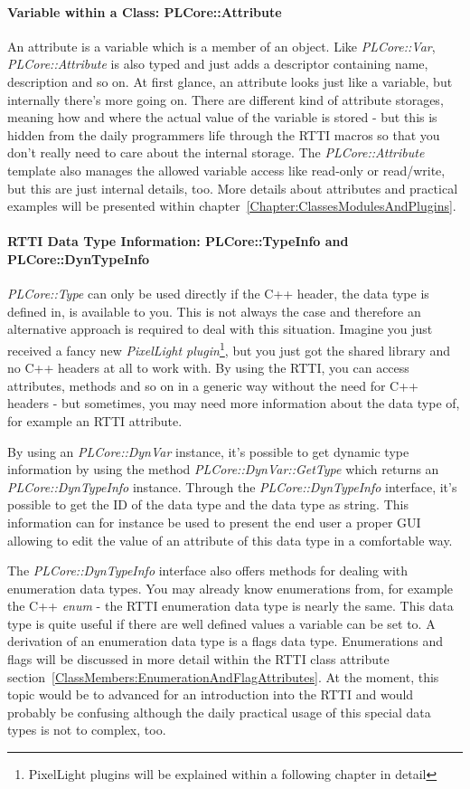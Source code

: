 \paragraph{Variable within a Class: PLCore::Attribute}
An attribute is a variable which is a member of an object. Like \emph{PLCore::Var}, \emph{PLCore::Attribute} is also typed and just adds a descriptor containing name, description and so on. At first glance, an attribute looks just like a variable, but internally there's more going on. There are different kind of attribute storages, meaning how and where the actual value of the variable is stored - but this is hidden from the daily programmers life through the RTTI macros so that you don't really need to care about the internal storage. The \emph{PLCore::Attribute} template also manages the allowed variable access like read-only or read/write, but this are just internal details, too. More details about attributes and practical examples will be presented within chapter~\ref{Chapter:ClassesModulesAndPlugins}.


\paragraph{RTTI Data Type Information: PLCore::TypeInfo and PLCore::DynTypeInfo}
\emph{PLCore::Type} can only be used directly if the C++ header, the data type is defined in, is available to you. This is not always the case and therefore an alternative approach is required to deal with this situation. Imagine you just received a fancy new \emph{PixelLight plugin}\footnote{PixelLight plugins will be explained within a following chapter in detail}, but you just got the shared library and no C++ headers at all to work with. By using the RTTI, you can access attributes, methods and so on in a generic way without the need for C++ headers - but sometimes, you may need more information about the data type of, for example an RTTI attribute.

By using an \emph{PLCore::DynVar} instance, it's possible to get dynamic type information by using the method \emph{PLCore::DynVar::GetType} which returns an \emph{PLCore::DynTypeInfo} instance. Through the \emph{PLCore::DynTypeInfo} interface, it's possible to get the ID of the data type and the data type as string. This information can for instance be used to present the end user a proper GUI allowing to edit the value of an attribute of this data type in a comfortable way.

The \emph{PLCore::DynTypeInfo} interface also offers methods for dealing with enumeration data types. You may already know enumerations from, for example the C++ \emph{enum} - the RTTI enumeration data type is nearly the same. This data type is quite useful if there are well defined values a variable can be set to. A derivation of an enumeration data type is a flags data type. Enumerations and flags will be discussed in more detail within the RTTI class attribute section~\ref{ClassMembers:EnumerationAndFlagAttributes}. At the moment, this topic would be to advanced for an introduction into the RTTI and would probably be confusing although the daily practical usage of this special data types is not to complex, too.


